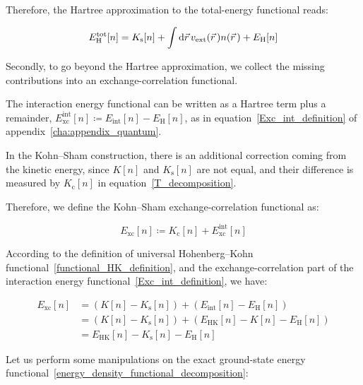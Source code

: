 Therefore, the Hartree approximation to the total-energy functional reads:

\begin{equation}
    E_\mathrm{H}^\mathrm{tot}[n]
    = K_\mathrm{s}[n]
    + \int \mathrm{d}{\vec{r}}\,v_\mathrm{ext}(\vec{r}\,)n(\vec{r}\,)
    + E_\mathrm{H}[n]
\label{hartree_total_energy_functional}
\end{equation}

Secondly, to go beyond the Hartree approximation,
we collect the missing contributions into an exchange-correlation functional.

The interaction energy functional can be written as a Hartree term plus a remainder,
$E_\mathrm{xc}^{\mathrm{int}}[n]\coloneqq E_\mathrm{int}[n]-E_\mathrm{H}[n]$,
as in equation~\eqref{Exc_int_definition} of appendix~\ref{cha:appendix_quantum}.

In the Kohn--Sham construction, there is an additional correction coming from the kinetic energy, since $K[n]$ and $K_\mathrm{s}[n]$ are not equal, and their difference is measured by $K_\mathrm{c}[n]$ in equation~\eqref{T_decomposition}.

Therefore, we define the Kohn--Sham exchange-correlation functional as:

\begin{equation}
    E_\mathrm{xc}[n]\coloneqq K_\mathrm{c}[n]+E_\mathrm{xc}^{\mathrm{int}}[n]
\label{Exc_KS_sum}
\end{equation}

According to the definition of universal Hohenberg--Kohn functional~\eqref{functional_HK_definition}, 
and the exchange-correlation part of the interaction energy functional~\eqref{Exc_int_definition},
we have:

\begin{equation}
\begin{aligned}
    E_\mathrm{xc}[n]
    &= (K[n]-K_\mathrm{s}[n]) + (E_\mathrm{int}[n]-E_\mathrm{H}[n]) \\
    &= (K[n]-K_\mathrm{s}[n]) + (E_\mathrm{HK}[n]-K[n]-E_\mathrm{H}[n]) \\
    &= E_\mathrm{HK}[n]-K_\mathrm{s}[n]-E_\mathrm{H}[n]
\end{aligned}
\label{Exc_KS_definition}
\end{equation}

Let us perform some manipulations on the exact ground-state energy functional~\eqref{energy_density_functional_decomposition}:


